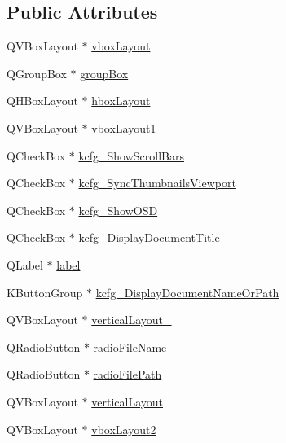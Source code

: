\subsection*{Public Attributes}
\begin{DoxyCompactItemize}
\item 
Q\+V\+Box\+Layout $\ast$ \hyperlink{classUi__DlgGeneralBase_ad85268c43c0919c56230704be03f092c}{vbox\+Layout}
\item 
Q\+Group\+Box $\ast$ \hyperlink{classUi__DlgGeneralBase_aa25408255cc1bc3b6d720b58ceb42e32}{group\+Box}
\item 
Q\+H\+Box\+Layout $\ast$ \hyperlink{classUi__DlgGeneralBase_a43bdd775726703c8af00b360880cd7a9}{hbox\+Layout}
\item 
Q\+V\+Box\+Layout $\ast$ \hyperlink{classUi__DlgGeneralBase_ada5c5c425bafcc272b9562c93ed886e8}{vbox\+Layout1}
\item 
Q\+Check\+Box $\ast$ \hyperlink{classUi__DlgGeneralBase_a58a8f3825a9f66542cd2e6e7e6e66ee9}{kcfg\+\_\+\+Show\+Scroll\+Bars}
\item 
Q\+Check\+Box $\ast$ \hyperlink{classUi__DlgGeneralBase_a3bd89dac60042cf193e8f294f8d255b1}{kcfg\+\_\+\+Sync\+Thumbnails\+Viewport}
\item 
Q\+Check\+Box $\ast$ \hyperlink{classUi__DlgGeneralBase_a15d077fb29bfbb39a64bf54cccb9a0d3}{kcfg\+\_\+\+Show\+O\+S\+D}
\item 
Q\+Check\+Box $\ast$ \hyperlink{classUi__DlgGeneralBase_a0283039d02817b23b8f52f3b670bd9a8}{kcfg\+\_\+\+Display\+Document\+Title}
\item 
Q\+Label $\ast$ \hyperlink{classUi__DlgGeneralBase_a6580c8bff94e006f767780163d3ca0da}{label}
\item 
K\+Button\+Group $\ast$ \hyperlink{classUi__DlgGeneralBase_a1e6d624833130b412bc2bea8a1861025}{kcfg\+\_\+\+Display\+Document\+Name\+Or\+Path}
\item 
Q\+V\+Box\+Layout $\ast$ \hyperlink{classUi__DlgGeneralBase_a3f67713f653ddd26bc82cb90b4836bd4}{vertical\+Layout\+\_}
\item 
Q\+Radio\+Button $\ast$ \hyperlink{classUi__DlgGeneralBase_a40cff822b48d52cb4524aa842477519a}{radio\+File\+Name}
\item 
Q\+Radio\+Button $\ast$ \hyperlink{classUi__DlgGeneralBase_ac39d9951537fef09370ebbbf6bf52d44}{radio\+File\+Path}
\item 
Q\+V\+Box\+Layout $\ast$ \hyperlink{classUi__DlgGeneralBase_a66524be0ec0dc019bbc7f31e2fd50526}{vertical\+Layout}
\item 
Q\+V\+Box\+Layout $\ast$ \hyperlink{classUi__DlgGeneralBase_aae73c98ee62ac66deae57632a9d82a4c}{vbox\+Layout2}

\end{DoxyCompactItemize}
